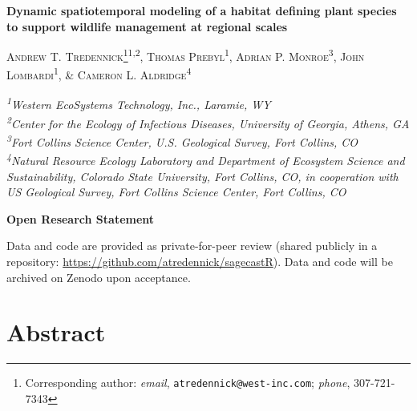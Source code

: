 \documentclass[
  12pt,
]{article}
\author{}
\date{\vspace{-2.5em}}
\begin{document}

\newcommand{\new}{\textcolor{red}} 
\newcommand{\comm}{\textcolor{ForestGreen}}
\newcommand{\response}{\textcolor{blue}}
\newcommand{\reply}{\textcolor{blue}}
\renewcommand*{\thefootnote}{\fnsymbol{footnote}}

\begin{centering}
\textbf{\Large{Dynamic spatiotemporal modeling of a habitat defining plant species to support wildlife management at regional scales}}

\textsc{\small{Andrew T. Tredennick\footnote{Corresponding author: \textit{email}, \texttt{atredennick@west-inc.com}; \textit{phone}, 307-721-7343}\textsuperscript{1,2}, Thomas Prebyl\textsuperscript{1}, Adrian P. Monroe\textsuperscript{3}, John Lombardi\textsuperscript{1}, \& Cameron L. Aldridge\textsuperscript{4}}}

\textit{\small{\textsuperscript{1}Western EcoSystems Technology, Inc., Laramie, WY}} \\
\textit{\small{\textsuperscript{2}Center for the Ecology of Infectious Diseases, University of Georgia, Athens, GA}} \\
\textit{\small{\textsuperscript{3}Fort Collins Science Center, U.S. Geological Survey, Fort Collins, CO}} \\
\textit{\small{\textsuperscript{4}Natural Resource Ecology Laboratory and Department of Ecosystem Science and Sustainability, Colorado State University, Fort Collins, CO, in cooperation with US Geological Survey, Fort Collins Science Center, Fort Collins, CO}}

\end{centering}

\renewcommand*{\thefootnote}{\arabic{footnote}}
\setcounter{footnote}{0}

\bigskip{}

\noindent{}\textbf{Open Research Statement}

\noindent{}Data and code are provided as private-for-peer review (shared publicly in a repository: \url{https://github.com/atredennick/sagecastR}). Data and code will be archived on Zenodo upon acceptance.

\newpage{}

\hypertarget{abstract}{%
\section{Abstract}\label{abstract}}
\end{document}
